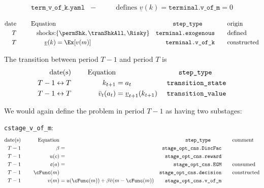 \documentclass[\econtexRoot/BufferStockTheory]{subfiles}
\newcommand{\EOP}{\bar}
\newcommand{\MOP}{}
\newcommand{\BOP}{\underline}
\begin{document}
\begin{align*}
  \texttt{term\_v\_of\_k.yaml} & - & \qquad \text{defines }\BOP{v}(k)=\texttt{terminal.v\_of\_m}=0
\end{align*}

\begin{alignat}{3}
\text{date} &      &   \notag \text{Equation} & \qquad                       & \qquad \texttt{step\_type} \qquad & \qquad \text{origin}
\\ T        & ~~~~ & \text{shocks:}           & \{\permShk,\tranShkAll,\Risky\} & \texttt{terminal.exogenous}       & \qquad \text{defined} \label{step:term_exogenous}
\\ T        & ~~~~ & \BOP{v}(k)               & = \Ex[\MOP{v}(m)]            & \texttt{terminal.v\_of\_k}        & \qquad \text{constructed} \label{step:term_expectorate}
\end{alignat}


The transition between period $T-1$ and period $T$ is
\begin{alignat}{3}
\text{date(s)}          &      &   \notag \text{Equation} & \qquad                   & \qquad \texttt{step\_type} \qquad & %
\\ T-1\leftrightarrow T & ~~~~ & k_{t+1}                  & = a_{t}                  & \texttt{transition\_state}        &  \label{step:transtate}
\\ T-1\leftrightarrow T & ~~~~ & \EOP{v}_{t}(a_{t})       & = \BOP{v}_{t+1}(k_{t+1}) & \texttt{transition\_value}        & \label{step:tranfunc}
\end{alignat}

We would again define the problem in period $T-1$ as having two substages:

\texttt{cstage\_v\_of\_m}:
\begin{alignat}{3}
\text{date(s)}              &      &   \notag \text{Equation} & \qquad                          & \qquad \texttt{step\_type} \qquad & \qquad \text{comment}
\\ T-1                    & ~~~~ & \beta                 & =                               & \texttt{stage\_opt\_cns.DiscFac}           & \label{step:discounting}
\\ T-1                    & ~~~~ &   u(c)                & =                               & \texttt{stage\_opt\_cns.reward}            & 
\\ T-1                    & ~~~~ &   \mathfrak{c}(a)     & =                               & \texttt{stage\_opt\_cns.EGM}               & \qquad \text{consumed}
\\ T-1                    & ~~~~ &   \cFunc(m)                &                                 & \texttt{stage\_opt\_cns.decision}          & \qquad \text{constructed} \label{step:cFuncMake}
\\ T-1                    & ~~~~ & \MOP{v}(m)                  & = u(\cFunc(m))+\beta \EOP{v}(m-\cFunc(m)) & \texttt{stage\_opt\_cns.v\_of\_m}          &
\end{alignat}
\end{document}
